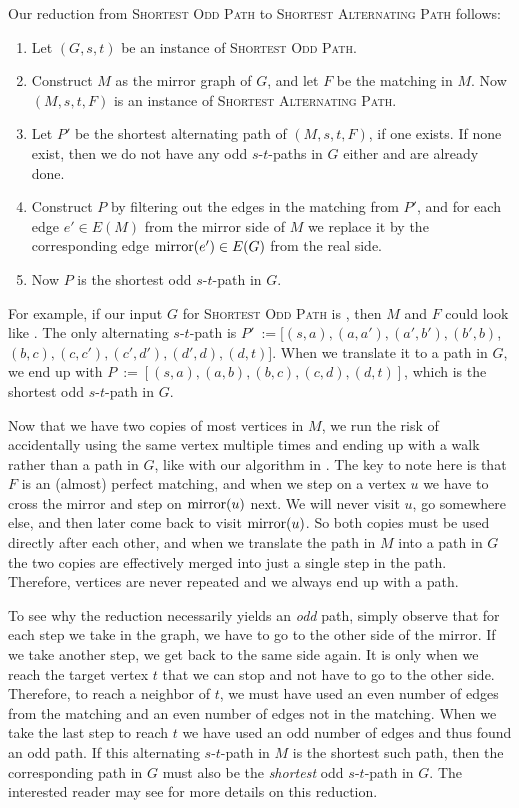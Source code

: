 Our reduction from \textsc{Shortest Odd Path} to \textsc{Shortest Alternating Path} follows:
\begin{enumerate}
    \item Let $(G, s, t)$ be an instance of \textsc{Shortest Odd Path}.
    \item Construct $M$ as the mirror graph of $G$, and let $F$ be the matching in $M$. Now $(M, s, t, F)$ is an instance of \textsc{Shortest Alternating Path}.
    \item Let $P'$ be the shortest alternating path of $(M, s, t, F)$, if one exists. If none exist, then we do not have any odd $s$-$t$-paths in $G$ either and are already done.
    \item Construct $P$ by filtering out the edges in the matching from $P'$, and for each edge $e' \in E(M)$ from the mirror side of $M$ we replace it by the corresponding edge $\operatorname{mirror}(e') \in E(G)$ from the real side.
    \label{point:translate_alternating_path}
    \item Now $P$ is the shortest odd $s$-$t$-path in $G$.
\end{enumerate}

For example, if our input $G$ for \textsc{Shortest Odd Path} is , then $M$ and $F$ could look like . The only alternating $s$-$t$-path is $P'~:= [(s,a), (a, a'), (a',b'), (b',b)$, $(b,c), (c,c'), (c',d'), (d',d), (d,t)]$. When we translate it to a path in $G$, we end up with $P~:= [(s,a),(a,b),(b,c),(c,d),(d,t)]$, which is the shortest odd $s$-$t$-path in $G$. 

Now that we have two copies of most vertices in $M$, we run the risk of accidentally using the same vertex multiple times and ending up with a walk rather than a path in $G$, like with our algorithm in . The key to note here is that $F$ is an (almost) perfect matching, and when we step on a vertex $u$ we have to cross the mirror and step on $\operatorname{mirror}(u)$ next. We will never visit $u$, go somewhere else, and then later come back to visit $\operatorname{mirror}(u)$. So both copies must be used directly after each other, and when we translate the path in $M$ into a path in $G$ the two copies are effectively merged into just a single step in the path. Therefore, vertices are never repeated and we always end up with a path.

To see why the reduction necessarily yields an \emph{odd} path, simply observe that for each step we take in the graph, we have to go to the other side of the mirror. If we take another step, we get back to the same side again. It is only when we reach the target vertex $t$ that we can stop and not have to go to the other side. Therefore, to reach a neighbor of $t$, we must have used an even number of edges from the matching and an even number of edges not in the matching. When we take the last step to reach $t$ we have used an odd number of edges and thus found an odd path. If this alternating $s$-$t$-path in $M$ is the shortest such path, then the corresponding path in $G$ must also be the \emph{shortest} odd $s$-$t$-path in $G$. The interested reader may see \cite{source:derigs_shortest_odd_path} for more details on this reduction.

